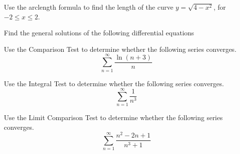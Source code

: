 \documentclass[11pt]{exam}
\begin{document}
\begin{questions}
\newpage
\addpoints
\question[2] Use the arclength formula to find the length of the curve $y=\sqrt{4-x^2}$, for $-2\leq x \leq 2$.

\newpage
\addpoints
\question Find the general solutions of the following differential equations
\newpage
\addpoints
\question[1] Use the Comparison Test to determine whether the following series converges. 
\begin{equation*}
\sum_{n=1}^{\infty} \frac{\ln(n+3)}{n}
\end{equation*}

\newpage 
\addpoints
\question[1] Use the Integral Test to determine whether the following series converges. 
\begin{equation*}
\sum_{n=1}^{\infty} \frac{1}{n^3}
\end{equation*}


\newpage
\addpoints
\question[1] Use the Limit Comparison Test to determine whether the following series converges. 
\begin{equation*}
\sum_{n=1}^{\infty} \frac{n^2-2n+1}{n^3+1}
\end{equation*}


\end{questions}
\end{document}

